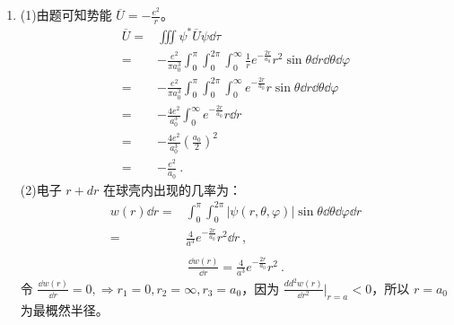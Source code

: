 
\begin{issues}
\issueDraft
\end{issues}


\subsection{ }
\begin{enumerate}
\item 
(1)由题可知势能 $\displaystyle \overline{U}=-\frac{e^2}{r}$。
\begin{equation}
\begin{aligned}
\overline{U}=&\iiint \psi^{*} \overline{U} \psi \dd{\tau}\\
=&-\frac{e^2}{\pi a^{3}_{0}}\int^{\pi}_{0}\int^{2\pi}_{0}\int^{\infty}_{0} \frac{1}{r}e^{-\frac{2r}{a_0}}r^{2}\sin{\theta} \dd{r}\dd{\theta}\dd{\varphi}\\
=&-\frac{e^{2}}{\pi a^{3}_{0}}\int^{\pi}_{0}\int^{2\pi}_{0}\int^{\infty}_{0} e^{-\frac{2r}{a_0}}r\sin{\theta} \dd{r}\dd{\theta}\dd{\varphi}\\
=&-\frac{4 e^2}{a^{3}_{0}}\int^{\infty}_{0}e^{-\frac{2r}{a_0}}r\dd{r}\\
=&-\frac{4e^{2}}{a^{3}_{0}}(\frac{a_{0}}{2})^2\\
=&-\frac{e^{2}}{a_{0}}~.
\end{aligned}
\end{equation}
(2)电子 $r+dr$ 在球壳内出现的几率为：\\
\begin{equation}
\begin{aligned}
w(r)\dd{r}=&\int^{\pi}_{0}\int^{2\pi}_{0} \lvert \psi(r,\theta,\varphi) \rvert \sin{\theta}\dd{\theta}\dd{\varphi}\dd{r}\\
=&\frac{4}{a^{3}}e^{-\frac{2r}{a_0}}r^2 \dd{r}~,\\
\end{aligned}
\end{equation}
\begin{equation}
\begin{aligned}
\frac{\dd{w(r)}}{\dd{r}}=\frac{4}{a^{3}}e^{-\frac{2r}{a_0}}r^2 ~.
\end{aligned}
\end{equation}
令 $\displaystyle \frac{\dd{w(r)}}{\dd{r}}=0,\Longrightarrow r_1 = 0,r_2 = \infty,r_3 = a_0$，因为 $\displaystyle \frac{dd^{2}{w(r)}}{\dd{r^{2}}}|_{r = a_{}} < 0$，所以 $r = a_0$ 为最概然半径。


\end{enumerate}
